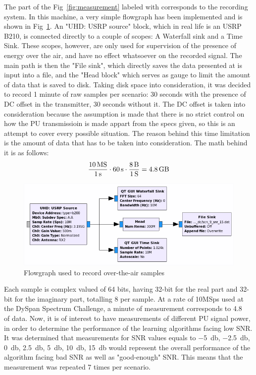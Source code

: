 The part of the Fig~\ref{fig:measurement} labeled with    corresponds to the recording system. In this machine, a very simple flowgraph has been implemented and is shown in Fig~\ref{fig:recording_flowgraph}. An "UHD: USRP source" block, which in real life is an \ac{USRP} B210, is connected directly to a couple of scopes: A Waterfall sink and a Time Sink. These scopes, however, are only used for supervision of the presence of energy over the air, and have no effect whatsoever on the recorded signal. The main path is then the "File sink", which directly saves the data presented at is input into a file, and the "Head block" which serves as gauge to limit the amount of data that is saved to disk. Taking disk space into consideration, it was decided to record 1 minute of raw samples per scenario: 30 seconds with the presence of DC offset in the transmitter, 30 seconds without it. The DC offset is taken into consideration because the assumption is made that there is no strict control on how the \ac{PU} transmissioin is made appart from the specs given, so this is an attempt to cover every possible situation. The reason behind this time limitation is the amount of data that has to be taken into consideration. The math behind it is as follows:
\begin{equation}
    \frac{\SI{10}{\mega S}}{\SI{1}{s}} \cdot \SI{60}{s} \cdot \frac{\SI{8}{\byte}}{\SI{1}{S}} = \SI{4.8}{\giga\byte}
\end{equation}

\begin{figure}[!htb]
    \centering
    \includegraphics[width=\textwidth]{figures/recording_flowgraph}
    \caption{Flowgraph used to record over-the-air samples}
    \label{fig:recording_flowgraph}
\end{figure}

Each sample is complex valued of 64 bits, having 32-bit for the real part and 32-bit for the imaginary part, totalling \SI{8}{\byte} per sample. At a rate of 10MSps used at the DySpan Spectrum Challenge, a minute of measurement corresponds to \SI{4.8}{\giga\byte} of data. Now, it is of interest to have measurements of different \ac{PU} signal power, in order to determine the performance of the learning algorithms facing low \ac{SNR}. It was determined that measurements for \ac{SNR} values equals to \SI{-5}{\decibel}, \SI{-2.5}{\decibel}, \SI{0}{\decibel}, \SI{2.5}{\decibel}, \SI{5}{\decibel}, \SI{10}{\decibel}, \SI{15}{\decibel} would represent the overall performance of the algorithm facing bad \ac{SNR} as well as "good-enough" \ac{SNR}. This means that the measurement was repeated 7 times per scenario.

